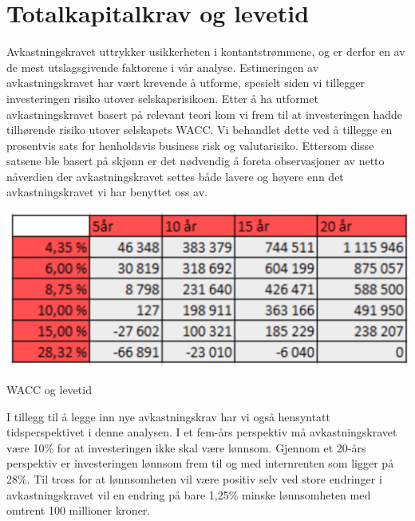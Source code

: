 \section{Totalkapitalkrav og levetid}
Avkastningskravet uttrykker usikkerheten i kontantstrømmene, og er derfor en av de mest utslagsgivende faktorene i vår analyse. Estimeringen av avkastningskravet har vært krevende å utforme, spesielt siden vi tillegger investeringen risiko utover selskapsrisikoen. Etter å ha utformet avkastningskravet basert på relevant teori kom vi frem til at investeringen hadde tilhørende risiko utover selskapets WACC. Vi behandlet dette ved å tillegge en prosentvis sats for henholdsvis business risk og valutarisiko. Ettersom disse satsene ble basert på skjønn er det nødvendig å foreta observasjoner av netto nåverdien der avkastningskravet settes både lavere og høyere enn det avkastningskravet vi har benyttet oss av.  

\begin{table}[H]
  \centering
  \includegraphics[scale=1.0]{tabeller/waccLevetid.png}
  \caption{WACC og levetid}
  \label{tbl:waccLevetid}
\end{table}

I tillegg til å legge inn nye avkastningskrav har vi også hensyntatt tidsperspektivet i denne analysen. I et fem-års perspektiv må avkastningskravet være 10\% for at investeringen ikke skal være lønnsom. Gjennom et 20-års perspektiv er investeringen lønnsom frem til og med internrenten som ligger på 28\%. Til tross for at lønnsomheten vil være positiv selv ved store endringer i avkastningskravet vil en endring på bare 1,25\% minske lønnsomheten med omtrent 100 millioner kroner. 

